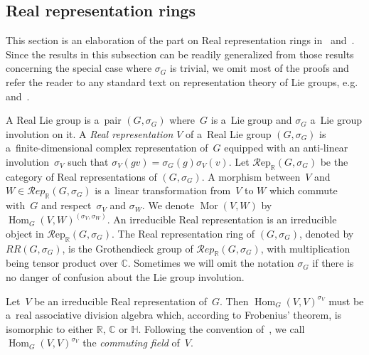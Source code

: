 \documentclass[pdftex]{sigma}
\numberwithin{equation}{section}
\DeclareMathOperator{\Mor}{Mor}
\DeclareMathOperator{\Hom}{Hom}
\begin{document}
\subsection{Real representation rings}
This section is an elaboration of the part on Real representation rings in~\cite{AS} and~\cite{Se}.
Since the results in this subsection can be readily generalized from those results concerning the special case
where $\sigma_G$ is trivial, we omit most of the proofs and refer the reader to any standard text on representation theory of
Lie groups, e.g.~\cite{B}
and~\cite{BtD}.
\begin{Definition}
A Real Lie group is a~pair $(G,\sigma_G)$ where~$G$ is a~Lie group and $\sigma_G$ a~Lie group involution on it.
A \emph{Real representation}
$V$ of a~Real Lie group $(G,\sigma_G)$ is a~f\/inite-dimensional complex representation of~$G$ equipped with an anti-linear involution~$\sigma_V$ such
that $\sigma_V(gv)=\sigma_G(g)\sigma_V(v)$.
Let $\mathcal{R}\text{ep}_\mathbb{R}(G,
\sigma_G)$ be the category of Real representations of $(G, \sigma_G)$.
A morphism between~$V$ and $W\in \mathcal{R}
ep_\mathbb{R}(G,
\sigma_G)$ is a~linear transformation from~$V$ to $W$ which commute with~$G$ and respect~$\sigma_V$ and $\sigma_W$.
We denote $\Mor
(V, W)$ by $\Hom_G(V, W)^{(\sigma_V, \sigma_W)}$.
An irreducible Real representation is an irreducible object in $\mathcal{R}\text{ep}_\mathbb{R}(G,
\sigma_G)$.
The Real representation ring of $(G, \sigma_G)$, denoted by $RR(G, \sigma_G)$, is the Grothendieck group of $\mathcal{R}
ep_\mathbb{R}(G,
\sigma_G)$, with multiplication being tensor product over $\mathbb{C}$.
Sometimes we will omit the notation $\sigma_G$ if there is no danger of confusion about the Lie group involution.
\end{Definition}
\begin{Remark}
Let~$V$ be an irreducible Real representation of~$G$.
Then $\Hom_G(V, V)^{\sigma_V}$ must be a~real associative division algebra which, according to Frobenius' theorem, is isomorphic to either
$\mathbb{R}$, $\mathbb{C}$ or $\mathbb{H}$.
Following the convention of~\cite{AS}, we call $\Hom_G(V, V)^{\sigma_V}$ the \emph{commuting field} of~$V$.
\end{Remark}
\end{document}
